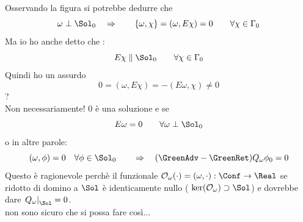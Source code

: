 \documentclass[Main]{subfiles}
\begin{document}
		\begin{Warning}
			Osservando la figura si potrebbe dedurre che 
			\begin{displaymath}
				\omega \perp \Sol_0 \quad \Rightarrow \qquad \{\omega, \chi\} = ( \omega , E \chi)=0 \qquad \forall \chi \in \Gamma_0
			\end{displaymath}
			Ma io ho anche detto che :
			\begin{displaymath}
				E \chi \parallel \Sol_0 \qquad \forall \chi \in \Gamma_0
			\end{displaymath}
			Quindi ho un assurdo
			\begin{displaymath}
				 0 = ( \omega , E \chi)=-( E\omega ,  \chi)\neq 0
			\end{displaymath}
			?\\
			Non necessariamente! 0 è una soluzione e se 
			\begin{displaymath}
				E\omega= 0   \qquad \forall \omega \perp \Sol_0
			\end{displaymath}
			o in altre parole: 
			\begin{displaymath}
				(\omega, \phi) = 0 \quad \forall \phi \in \Sol_0  \qquad \Rightarrow  \quad(\GreenAdv - \GreenRet) Q_\omega \phi_0= 0 
			\end{displaymath}
			Questo è ragionevole perchè il funzionale $\mathcal{O}_\omega (\cdot) = ( \omega, \cdot): \Conf \rightarrow \Real$ se ridotto di domino a $\Sol$ è identicamente nullo ( $\ker(\mathcal{O}_\omega) \supset \Sol$) e  dovrebbe dare $\left. Q_\omega \right\vert_\Sol = 0$.
			\\ non sono sicuro che si possa fare così... 
			
			
		\end{Warning}
	
\end{document}

